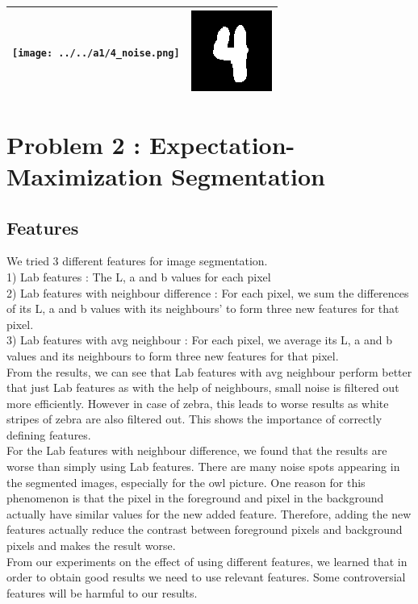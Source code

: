 \documentclass{article}
\begin{document}
\begin{center}
 \begin{tabular}{||c c||}
 \hline
 \texttt{[image: ../../a1/4\_noise.png]} & \includegraphics[width=.4\linewidth]{../image-denoising/output/4_denoise.png} \\ 
 \hline

\end{tabular}
\end{center}


\section{Problem 2 : Expectation-Maximization Segmentation}
\subsection{Features}
We tried 3 different features for image segmentation.\\
1) Lab features : The L, a and b values for each pixel \\
2) Lab features with neighbour difference : For each pixel, we sum the differences of its L, a and b values with its neighbours' to form three new features for that pixel. \\
3) Lab features with avg neighbour : For each pixel, we average its L, a and b values and its neighbours to form three new features for that pixel. \\

From the results, we can see that Lab features with avg neighbour perform better that just Lab features as with the help of neighbours, small noise is filtered out more efficiently. However in case of zebra, this leads to worse results as white stripes of zebra are also filtered out. This shows the importance of correctly defining features. \\
For the Lab features with neighbour difference, we found that the results are worse than simply using Lab features. There are many noise spots appearing in the segmented images, especially for the owl picture. One reason for this phenomenon is that the pixel in the foreground and pixel in the background actually have similar values for the new added feature. Therefore, adding the new features actually reduce the contrast between foreground pixels and background pixels and makes the result worse. \\
From our experiments on the effect of using different features, we learned that in order to obtain good results we need to use relevant features. Some controversial features will be harmful to our results. \\
\end{document}
